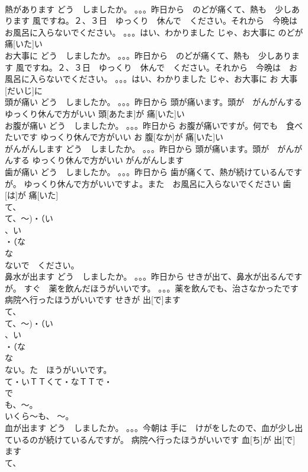 \documentclass[8pt]{extreport}
\begin{document}
\begin{CJK}{UTF8}{min}
\\	熱があります	どう　しましたか。 。。。昨日から　のどが痛くて、熱も　少しあります 風ですね。２、３日　ゆっくり　休んで　ください。それから　今晩は　お風呂に入らないでください。 。。。はい、わかりました じゃ、お大事に	のどが 痛[いた]い					
\\	お大事に	どう　しましたか。 。。。昨日から　のどが痛くて、熱も　少しあります 風ですね。２、３日　ゆっくり　休んで　ください。それから　今晩は　お風呂に入らないでください。 。。。はい、わかりました じゃ、お大事に	お 大事[だいじ]に			
\\	頭が痛い	どう　しましたか。 。。。昨日から 頭が痛います。頭が　がんがんする ゆっくり休んで方がいい	頭[あたま]が 痛[いた]い			
\\	お腹が痛い	どう　しましたか。 。。。昨日から お腹が痛いですが。何でも　食べたいです ゆっくり休んで方がいい	お 腹[なか]が 痛[いた]い			
\\	がんがんします	どう　しましたか。 。。。昨日から 頭が痛います。頭が　がんがんする ゆっくり休んで方がいい	がんがんします			
\\	歯が痛い	どう　しましたか。 。。。昨日から 歯が痛くて、熱が続けているんですが。 ゆっくり休んで方がいいですよ。また　お風呂に入らないでください	歯[は]が 痛[いた]			
\\	て、
\\	て、～)・（い
\\	、い
\\	・（な
\\	な
\\	ないで　ください。
\\	鼻水が出ます	どう　しましたか。 。。。昨日から せきが出て、鼻水が出るんですが。 すぐ　薬を飲んだほうがいいです。 。。。薬を飲んでも、治さなかったです 病院へ行ったほうがいいです	せきが 出[で]ます			
\\	て、
\\	て、～)・（い
\\	、い
\\	・（な
\\	な
\\	ない。た　ほうがいいです。
\\	て・いＴＴくて・なＴＴで・
\\	で
\\	も、～。
\\	いくら～も、 ～。
\\	血が出ます	どう　しましたか。 。。。今朝は 手に　けがをしたので、血が少し出ているのが続けているんですが。 病院へ行ったほうがいいです	血[ち]が 出[で]ます			
\\	て、

\end{CJK}
\end{document}
